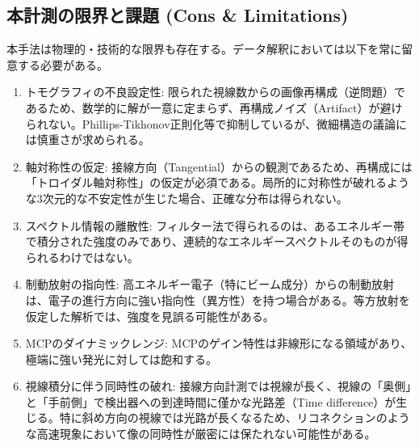 \subsection{本計測の限界と課題 (Cons \& Limitations)}
本手法は物理的・技術的な限界も存在する。データ解釈においては以下を常に留意する必要がある。

\begin{enumerate}
    \item トモグラフィの不良設定性:
    限られた視線数からの画像再構成（逆問題）であるため、数学的に解が一意に定まらず、再構成ノイズ（Artifact）が避けられない。Phillips-Tikhonov正則化等で抑制しているが、微細構造の議論には慎重さが求められる。
    
    \item 軸対称性の仮定:
    接線方向（Tangential）からの観測であるため、再構成には「トロイダル軸対称性」の仮定が必須である。局所的に対称性が破れるような3次元的な不安定性が生じた場合、正確な分布は得られない。
    
    \item スペクトル情報の離散性:
    フィルター法で得られるのは、あるエネルギー帯で積分された強度のみであり、連続的なエネルギースペクトルそのものが得られるわけではない。
    
    \item 制動放射の指向性:
    高エネルギー電子（特にビーム成分）からの制動放射は、電子の進行方向に強い指向性（異方性）を持つ場合がある。等方放射を仮定した解析では、強度を見誤る可能性がある。
    
    \item MCPのダイナミックレンジ:
    MCPのゲイン特性は非線形になる領域があり、極端に強い発光に対しては飽和する。
    
    \item 視線積分に伴う同時性の破れ:
    接線方向計測では視線が長く、視線の「奥側」と「手前側」で検出器への到達時間に僅かな光路差（Time difference）が生じる。特に斜め方向の視線では光路が長くなるため、リコネクションのような高速現象において像の同時性が厳密には保たれない可能性がある。
\end{enumerate}